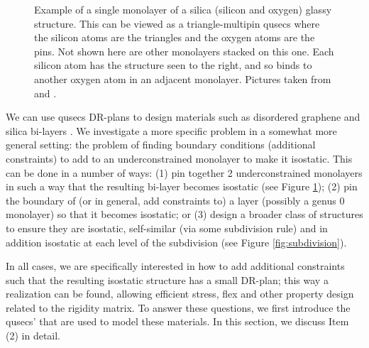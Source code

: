\begin{figure}
    \caption{Example of a single monolayer of a silica (silicon and oxygen) glassy structure. This can be viewed as a triangle-multipin qusecs where the silicon atoms are the triangles and the oxygen atoms are the pins. Not shown here are other monolayers stacked on this one. Each silicon atom has the structure seen to the right, and so binds to another oxygen atom in an adjacent monolayer. Pictures taken from \cite{silica_figure} and \cite{tetra_silica_figure}.}
    \label{fig:silica_glass}
\end{figure}


We can use qusecs DR-plans to design materials such as disordered graphene and silica bi-layers \cite{silica_bilayers} \cite{sructure_of_2d_glass}. We investigate a more specific problem in a somewhat more general setting: the problem of finding boundary conditions (additional constraints) to add to an underconstrained monolayer to make it isostatic. This can be done in a number of ways: (1) pin together 2 underconstrained monolayers in such a way that the resulting bi-layer becomes isostatic (see Figure \ref{fig:silica_glass}); (2) pin the boundary of (or in general, add constraints to) a layer (possibly a genus 0 monolayer) so that it becomes isostatic; or (3) design a broader class of structures to ensure they are isostatic, self-similar (via some subdivision rule) and in addition isostatic at each level of the subdivision (see Figure \ref{fig:subdivision}).

In all cases, we are specifically interested in how to add additional constraints such that the resulting isostatic structure has a small DR-plan; this way a realization can be found, allowing efficient stress, flex and other property design related to the rigidity matrix. To answer these questions, we first introduce the qusecs' that are used to model these materials. In this section, we discuss Item (2) in detail.


